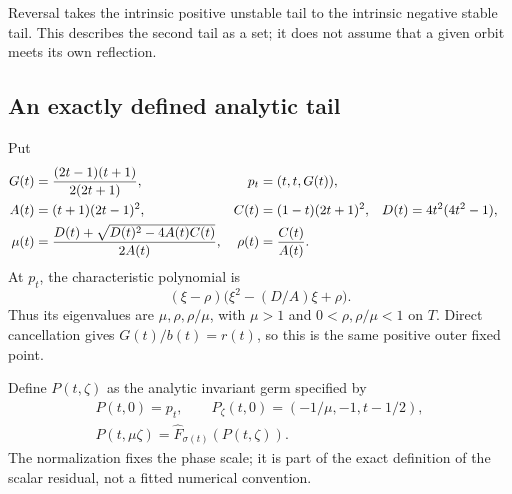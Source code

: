 Reversal takes the intrinsic positive unstable tail to the intrinsic
negative stable tail. This describes the second tail as a set; it does not
assume that a given orbit meets its own reflection.

\subsection{An exactly defined analytic tail}
Put
\begin{align}
 G(t)&=\frac{(2t-1)(t+1)}{2(2t+1)},&
 p_t&=(t,t,G(t)),\label{eq:G}\\
 A(t)&=(t+1)(2t-1)^2,&
 C(t)&=(1-t)(2t+1)^2,&
 D(t)&=4t^2(4t^2-1),\notag\\
 \mu(t)&=\frac{D(t)+\sqrt{D(t)^2-4A(t)C(t)}}{2A(t)},&
 \rho(t)&=\frac{C(t)}{A(t)}.\label{eq:mu}
\end{align}
At \(p_t\), the characteristic polynomial is
\[
 (\xi-\rho)\bigl(\xi^2-(D/A)\xi+\rho\bigr).
\]
Thus its eigenvalues are \(\mu,\rho,\rho/\mu\), with
\(\mu>1\) and \(0<\rho,\rho/\mu<1\) on \(T\). Direct cancellation gives
\(G(t)/b(t)=r(t)\), so this is the same positive outer fixed point.

Define \(P(t,\zeta)\) as the analytic invariant germ specified by
\begin{equation}\label{eq:germ}
\begin{gathered}
 P(t,0)=p_t,\qquad P_\zeta(t,0)=(-1/\mu,-1,t-1/2),\\
 P(t,\mu\zeta)=\widehat F_{\sigma(t)}(P(t,\zeta)).
\end{gathered}
\end{equation}
The normalization fixes the phase scale; it is part of the exact definition
of the scalar residual, not a fitted numerical convention.

